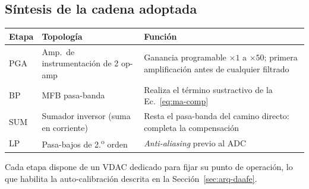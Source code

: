 \subsection{S\'intesis de la cadena adoptada}

\begin{center}\footnotesize
\begin{tabularx}{\textwidth}{@{}l l X@{}}
\toprule
Etapa & Topolog\'ia & Funci\'on \\
\midrule
PGA & Amp.\ de instrumentaci\'on de 2 op-amp & Ganancia programable $\times1$ a $\times50$; primera amplificaci\'on antes de cualquier filtrado \\
BP  & MFB pasa-banda & Realiza el t\'ermino sustractivo de la Ec.~\eqref{eq:ma-comp} \\
SUM & Sumador inversor (suma en corriente) & Resta el pasa-banda del camino directo: completa la compensaci\'on \\
LP  & Pasa-bajos de 2.\textsuperscript{o} orden & \emph{Anti-aliasing} previo al ADC \\
\bottomrule
\end{tabularx}
\end{center}

Cada etapa dispone de un VDAC dedicado para fijar su punto de operaci\'on, lo que habilita
la auto-calibraci\'on descrita en la Secci\'on~\ref{sec:arq-daafe}.
